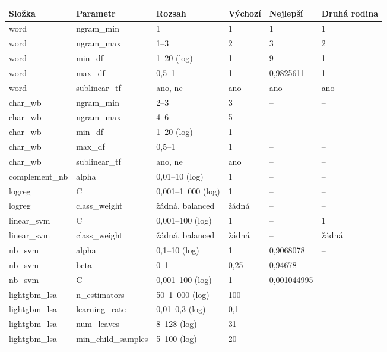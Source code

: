 \begin{tabular}{llllll}
\toprule
Složka & Parametr & Rozsah & Výchozí & Nejlepší & Druhá rodina\\
\midrule
word & ngram\_min & 1 & 1 & 1 & 1\\
word & ngram\_max & 1–3 & 2 & 3 & 2\\
word & min\_df & 1–20 (log) & 1 & 9 & 1\\
word & max\_df & 0,5–1 & 1 & 0,9825611 & 1\\
word & sublinear\_tf & ano, ne & ano & ano & ano\\
char\_wb & ngram\_min & 2–3 & 3 & – & –\\
char\_wb & ngram\_max & 4–6 & 5 & – & –\\
char\_wb & min\_df & 1–20 (log) & 1 & – & –\\
char\_wb & max\_df & 0,5–1 & 1 & – & –\\
char\_wb & sublinear\_tf & ano, ne & ano & – & –\\
complement\_nb & alpha & 0,01–10 (log) & 1 & – & –\\
logreg & C & 0,001–1 000 (log) & 1 & – & –\\
logreg & class\_weight & žádná, balanced & žádná & – & –\\
linear\_svm & C & 0,001–100 (log) & 1 & – & 1\\
linear\_svm & class\_weight & žádná, balanced & žádná & – & žádná\\
nb\_svm & alpha & 0,1–10 (log) & 1 & 0,9068078 & –\\
nb\_svm & beta & 0–1 & 0,25 & 0,94678 & –\\
nb\_svm & C & 0,001–100 (log) & 1 & 0,001044995 & –\\
lightgbm\_lsa & n\_estimators & 50–1 000 (log) & 100 & – & –\\
lightgbm\_lsa & learning\_rate & 0,01–0,3 (log) & 0,1 & – & –\\
lightgbm\_lsa & num\_leaves & 8–128 (log) & 31 & – & –\\
lightgbm\_lsa & min\_child\_samples & 5–100 (log) & 20 & – & –\\
\bottomrule
\end{tabular}

